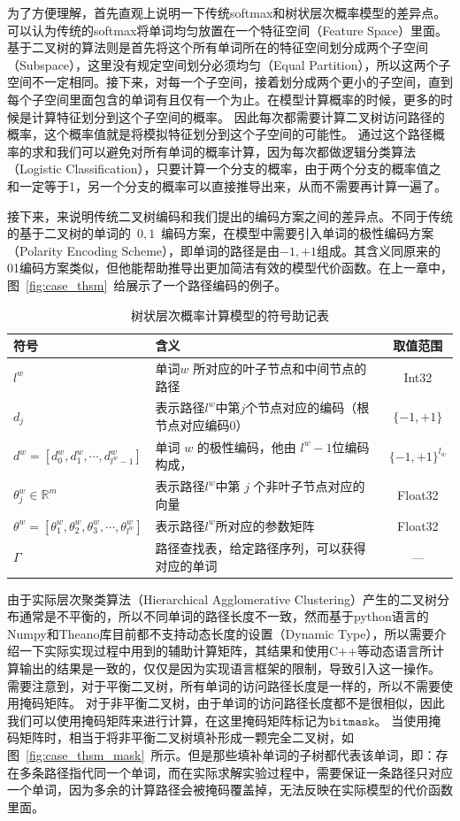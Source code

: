 为了方便理解，首先直观上说明一下传统softmax和树状层次概率模型的差异点。可以认为传统的softmax将单词均匀放置在一个特征空间（Feature Space）里面。基于二叉树的算法则是首先将这个所有单词所在的特征空间划分成两个子空间（Subspace），这里没有规定空间划分必须均匀（Equal Partition），所以这两个子空间不一定相同。接下来，对每一个子空间，接着划分成两个更小的子空间，直到每个子空间里面包含的单词有且仅有一个为止。在模型计算概率的时候，更多的时候是计算特征划分到这个子空间的概率。
因此每次都需要计算二叉树访问路径的概率，这个概率值就是将模拟特征划分到这个子空间的可能性。
通过这个路径概率的求和我们可以避免对所有单词的概率计算，因为每次都做逻辑分类算法（Logistic Classification），只要计算一个分支的概率，由于两个分支的概率值之和一定等于1，另一个分支的概率可以直接推导出来，从而不需要再计算一遍了。


接下来，来说明传统二叉树编码和我们提出的编码方案之间的差异点。不同于传统的基于二叉树的单词的~$0,1$~编码方案，在模型中需要引入单词的极性编码方案（Polarity Encoding Scheme），即单词的路径是由$-1,+1$组成。其含义同原来的01编码方案类似，但他能帮助推导出更加简洁有效的模型代价函数。在上一章中，图~\ref{fig:case_thsm}~给展示了一个路径编码的例子。

\begin{table}[!t]
  \centering
  \caption{树状层次概率计算模型的符号助记表\label{tab:note}}
\begin{tabular}{llc}
  \toprule
   符号&含义&取值范围\\ \midrule
$l^w$ &单词$w$ 所对应的叶子节点和中间节点的路径&Int32 \\
$d_j$&表示路径$l^w$中第$j$个节点对应的编码（根节点对应编码$0$）&$ \{-1,+1\}$\\
$ d^w=[d_0^w,d_1^w,\cdots,d_{l^w-1}^w] $& 单词 $w$ 的极性编码，他由 $l^w-1$位编码构成，&$\{-1,+1\}^{l_w}$\\
$\theta_{j}^w\in\mathbb{R}^m$ &表示路径$l^w$中第 $j$ 个非叶子节点对应的向量& Float32\\
$ \theta^w=[\theta_1^w,\theta_2^w,\theta_3^w, \cdots,\theta_{l^w}^w]$&表示路径$l^w$所对应的参数矩阵&Float32 \\
$\Gamma$ &路径查找表，给定路径序列，可以获得对应的单词& ---\\
  \bottomrule
\end{tabular}
\end{table}

由于实际层次聚类算法（Hierarchical Agglomerative Clustering）产生的二叉树分布通常是不平衡的，所以不同单词的路径长度不一致，然而基于python语言的Numpy和Theano库目前都不支持动态长度的设置（Dynamic Type），所以需要介绍一下实际实现过程中用到的辅助计算矩阵，其结果和使用C++等动态语言所计算输出的结果是一致的，仅仅是因为实现语言框架的限制，导致引入这一操作。
需要注意到，对于平衡二叉树，所有单词的访问路径长度是一样的，所以不需要使用掩码矩阵。
对于非平衡二叉树，由于单词的访问路径长度都不是很相似，因此我们可以使用掩码矩阵来进行计算，在这里掩码矩阵标记为$\mathtt{bitmask}$。
当使用掩码矩阵时，相当于将非平衡二叉树填补形成一颗完全二叉树，如图~\ref{fig:case_thsm_mask}~所示。但是那些填补单词的子树都代表该单词，即：存在多条路径指代同一个单词，而在实际求解实验过程中，需要保证一条路径只对应一个单词，因为多余的计算路径会被掩码覆盖掉，无法反映在实际模型的代价函数里面。


